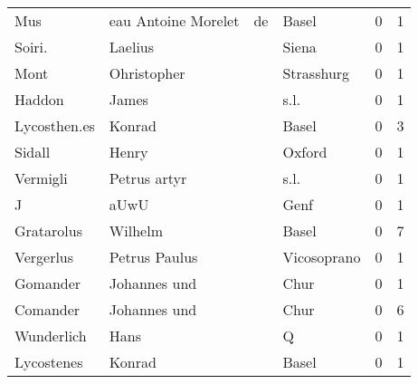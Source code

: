 \begin{center}
\begin{tiny}
\begin{longtabu}{llllrr}
                      Mus &                eau Antoine Morelet &          de &                                       Basel &          0 &         1 \\
                   Soiri. &                            Laelius &             &                                       Siena &          0 &         1 \\
                     Mont &                        Ohristopher &             &                                  Strasshurg &          0 &         1 \\
                   Haddon &                              James &             &                                        s.l. &          0 &         1 \\
             Lycosthen.es &                             Konrad &             &                                       Basel &          0 &         3 \\
                   Sidall &                              Henry &             &                                      Oxford &          0 &         1 \\
                 Vermigli &                       Petrus artyr &             &                                        s.l. &          0 &         1 \\
                        J &                               aUwU &             &                                        Genf &          0 &         1 \\
               Gratarolus &                            Wilhelm &             &                                       Basel &          0 &         7 \\
                Vergerlus &                      Petrus Paulus &             &                                 Vicosoprano &          0 &         1 \\
                 Gomander &                       Johannes und &             &                                        Chur &          0 &         1 \\
                 Comander &                       Johannes und &             &                                        Chur &          0 &         6 \\
               Wunderlich &                               Hans &             &                                           Q &          0 &         1 \\
               Lycostenes &                             Konrad &             &                                       Basel &          0 &         1 \\

\end{longtabu}
\end{tiny}
\end{center}
